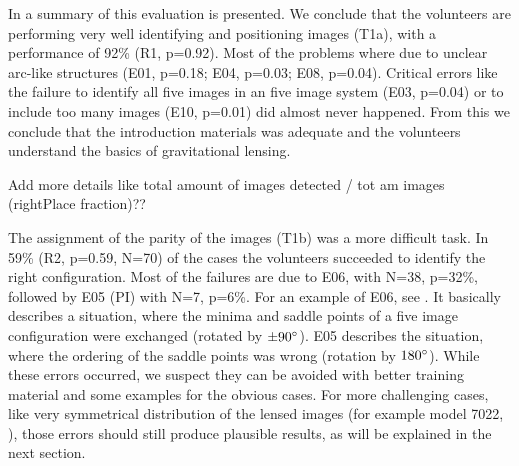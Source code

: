 


In  a summary of this evaluation is presented.
We conclude that the volunteers are performing very well identifying and positioning images (T1a), with a performance of 92\% (R1, p=0.92).
Most of the problems where due to unclear arc-like structures (E01, p=0.18; E04, p=0.03; E08, p=0.04).
Critical errors like the failure to identify all five images in an five image system (E03, p=0.04) or to include too many images (E10, p=0.01) did almost never happened.
From this we conclude that the introduction materials was adequate and the volunteers understand the basics of gravitational lensing.

 Add more details like total amount of images detected / tot am images (rightPlace fraction)??

The assignment of the parity of the images (T1b) was a more difficult task.
In 59\% (R2, p=0.59, N=70) of the cases the volunteers succeeded to identify the right configuration.
Most of the failures are due to E06, with N=38, p=32\%, followed by E05 (PI) with N=7, p=6\%.
For an example of E06, see .
It basically describes a situation, where the minima and saddle points of a five image configuration were exchanged (rotated by $\pm90^{\circ}$).
E05 describes the situation, where the ordering of the saddle points was wrong (rotation by $180^{\circ}$).
While these errors occurred, we suspect they can be avoided with better training material and some examples for the obvious cases.
For more challenging cases, like very symmetrical distribution of the lensed images (for example model 7022, ), those errors should still produce plausible results, as will be explained in the next section.







